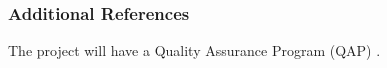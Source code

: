 \documentclass[12pt, letterpaper]{article}
\begin{document}
\newpage
\subsubsection*{Additional References}
The project will have a Quality Assurance Program (QAP) \citep{usepa_qaqc_2002, ieee_qaqc_2004, 36cfr_nara_2017}.\\
\citep{bulluck_organic_2002}


\clearpage 
\renewcommand{\thepage}{}


\end{document}
